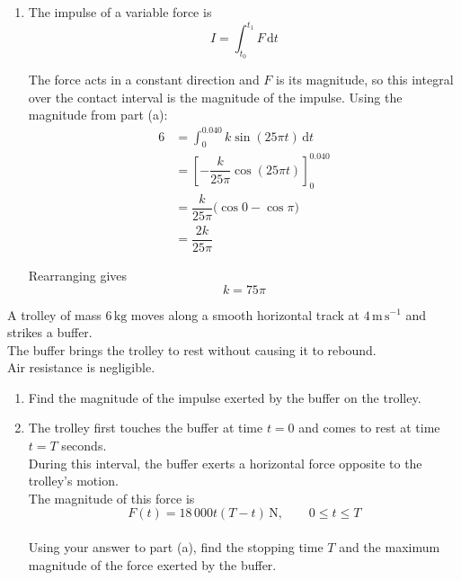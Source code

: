 \documentclass[leqno]{article}
\begin{document}
\begin{enumerate}[
  label=\textbf{\arabic*.},
  leftmargin=*,
  topsep=0pt,
  partopsep=0pt,
  parsep=0pt
]
\begin{djsSolution}
\begin{enumerate}[label=\textbf{(\alph*)}, start=1]
Since \(\mathbf{i}\) and \(\mathbf{j}\) are perpendicular, its magnitude is
\[
|\mathbf{I}|=\sqrt{(-3.6)^2+4.8^2}=6\,\mathrm{N\,s}
\]

\item The impulse of a variable force is
\[
I=\int_{t_0}^{t_1}F\,\mathrm{d}t
\]

The force acts in a constant direction and \(F\) is its magnitude, so this integral over the contact interval is the magnitude of the impulse. Using the magnitude from part (a):
\begin{align*}
6&=\int_0^{0.040}k\sin(25\pi t)\,\mathrm{d}t\\
&=\left[-\dfrac{k}{25\pi}\cos(25\pi t)\right]_0^{0.040}\\
&=\dfrac{k}{25\pi}\bigl(\cos 0-\cos\pi\bigr)\\
&=\dfrac{2k}{25\pi}
\end{align*}

Rearranging gives
\[
k=75\pi
\]

\end{enumerate}
\end{djsSolution}

\newpage

\questionitem

A trolley of mass $6\,\mathrm{kg}$ moves along a smooth horizontal track at $4\,\mathrm{m\,s^{-1}}$ and strikes a buffer. \\
The buffer brings the trolley to rest without causing it to rebound. \\
Air resistance is negligible. \\
\begin{enumerate}[label=\textbf{(\alph*)}]
\item Find the magnitude of the impulse exerted by the buffer on the trolley.  \\
\item The trolley first touches the buffer at time $t=0$ and comes to rest at time $t=T$ seconds. \\
During this interval, the buffer exerts a horizontal force opposite to the trolley's motion. \\
The magnitude of this force is
\[
F(t)=18\,000t(T-t)\,\mathrm{N},\qquad 0\leq t\leq T
\] \\
Using your answer to part (a), find the stopping time $T$ and the maximum magnitude of the force exerted by the buffer.  \\
\end{enumerate}


\end{enumerate}
\end{document}
